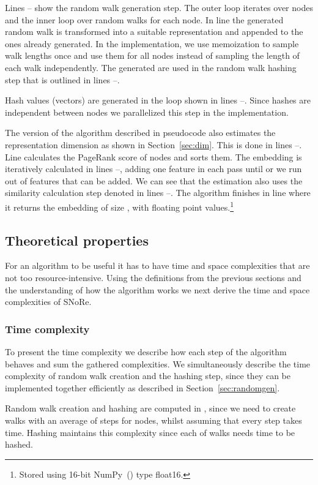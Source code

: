 \documentclass[twoside,11pt]{article}
\begin{document}
Lines -- show the random walk generation step. The outer loop iterates over nodes and the inner loop over random walks for each node. In line  the generated random walk is transformed into a suitable representation and appended to the ones already generated. In the implementation, we use memoization to sample walk lengths once and use them for all nodes instead of sampling the length of each walk independently. The generated  are used in the random walk hashing step that is outlined in lines --.

Hash values (vectors) are generated in the loop shown in lines --. Since hashes are independent between nodes we parallelized this step in the implementation.

The version of the algorithm described in pseudocode also estimates the representation dimension as shown in Section~\ref{sec:dim}. This is done in lines --. Line  calculates the PageRank score of nodes and sorts them. The embedding is iteratively calculated in lines --, adding one feature in each pass until  or we run out of features that can be added. We can see that the estimation also uses the similarity calculation step denoted in lines --.
The algorithm finishes in line  where it returns the embedding of size , with  floating point values.\footnote{Stored using 16-bit NumPy~(\cite{van2011numpy,oliphant2006guide}) type float16.}

\subsection{Theoretical properties}
\label{sec:properties}
For an algorithm to be useful it has to have time and space complexities that are not too resource-intensive. Using the definitions from the previous sections and the understanding of how the algorithm works we next derive the time and space complexities of SNoRe.

\subsubsection{Time complexity}
\label{sec:prop-time}
To present the time complexity we describe how each step of the algorithm behaves and sum the gathered complexities. We simultaneously describe the time complexity of random walk creation and the hashing step, since they can be implemented together efficiently as described in Section~\ref{sec:randomgen}. 

Random walk creation and hashing are computed in , since we need to create  walks with an average of  steps for  nodes, whilst assuming that every step takes  time. Hashing maintains this complexity since each of  walks needs  time to be hashed.
\end{document}
